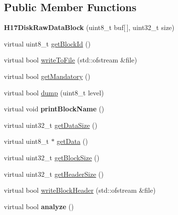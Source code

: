 \subsection*{Public Member Functions}
\begin{DoxyCompactItemize}
\item 
\hypertarget{classH17DiskRawDataBlock_a38985e3d002a8e2b61fe94c92e8f88ed}{}{\bfseries H17\+Disk\+Raw\+Data\+Block} (uint8\+\_\+t buf\mbox{[}$\,$\mbox{]}, uint32\+\_\+t size)\label{classH17DiskRawDataBlock_a38985e3d002a8e2b61fe94c92e8f88ed}

\item 
virtual uint8\+\_\+t \hyperlink{classH17DiskRawDataBlock_a79f9a190799eb468771618de21830464}{get\+Block\+Id} ()
\item 
virtual bool \hyperlink{classH17DiskRawDataBlock_a1f7e142b548e0c6c6b6984fda36571c4}{write\+To\+File} (std\+::ofstream \&file)
\item 
virtual bool \hyperlink{classH17DiskRawDataBlock_a45656c24c20b6f3697cfb362a41eec91}{get\+Mandatory} ()
\item 
virtual bool \hyperlink{classH17DiskRawDataBlock_a1abf25a2913da6a6bcbeab31d22789d7}{dump} (uint8\+\_\+t level)
\item 
\hypertarget{classH17DiskRawDataBlock_a062e6d77facc569af30c551225215132}{}virtual void {\bfseries print\+Block\+Name} ()\label{classH17DiskRawDataBlock_a062e6d77facc569af30c551225215132}

\item 
virtual uint32\+\_\+t \hyperlink{classH17Block_aa2e87b141623b4c897c5337ea0535d1c}{get\+Data\+Size} ()
\item 
virtual uint8\+\_\+t $\ast$ \hyperlink{classH17Block_a6c2432cccdacdfb1a335bd924f19d942}{get\+Data} ()
\item 
virtual uint32\+\_\+t \hyperlink{classH17Block_a0327b6359cdf502269bbb7c6f35fae18}{get\+Block\+Size} ()
\item 
virtual uint32\+\_\+t \hyperlink{classH17Block_ad71ae203afc8713d4ee7416757fadbbe}{get\+Header\+Size} ()
\item 
virtual bool \hyperlink{classH17Block_a5c4d56a6c991c87fb9215797ce63b804}{write\+Block\+Header} (std\+::ofstream \&file)
\item 
\hypertarget{classH17Block_ae53600d945ed3ffac13d3a769a1e1ab2}{}virtual bool {\bfseries analyze} ()\label{classH17Block_ae53600d945ed3ffac13d3a769a1e1ab2}

\end{DoxyCompactItemize}
